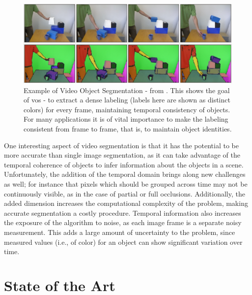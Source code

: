 \begin{figure}
\label{fig:ExampleSegmentation}
\centering
\includegraphics[width=\linewidth]{figures/Introduction/Video_Segmentation.pdf}
\caption[Example of Video Object Segmentation]{Example of Video Object Segmentation - from \cite{Abramov_WACV12}. This shows the goal of \gls{vos} - to extract a dense labeling (labels here are shown as distinct colors) for every frame, maintaining temporal consistency of objects. For many applications it is of vital importance to make the labeling consistent from frame to frame, that is, to maintain object identities.}
\end{figure}

One interesting aspect of video segmentation is that it has the potential to be more accurate than single image segmentation, as it can take advantage of the temporal coherence of objects to infer information about the objects in a scene. Unfortunately, the addition of the temporal domain brings along new challenges as well; for instance that pixels which should be grouped across time may not be continuously visible, as in the case of partial or full occlusions. Additionally, the added dimension increases the computational complexity of the problem, making accurate segmentation a costly procedure. Temporal information also increases the exposure of the algorithm to noise, as each image frame is a separate noisy measurement. This adds a large amount of uncertainty to the problem, since measured values (i.e., of color) for an object can show significant variation over time. 
 
\section{State of the Art}
